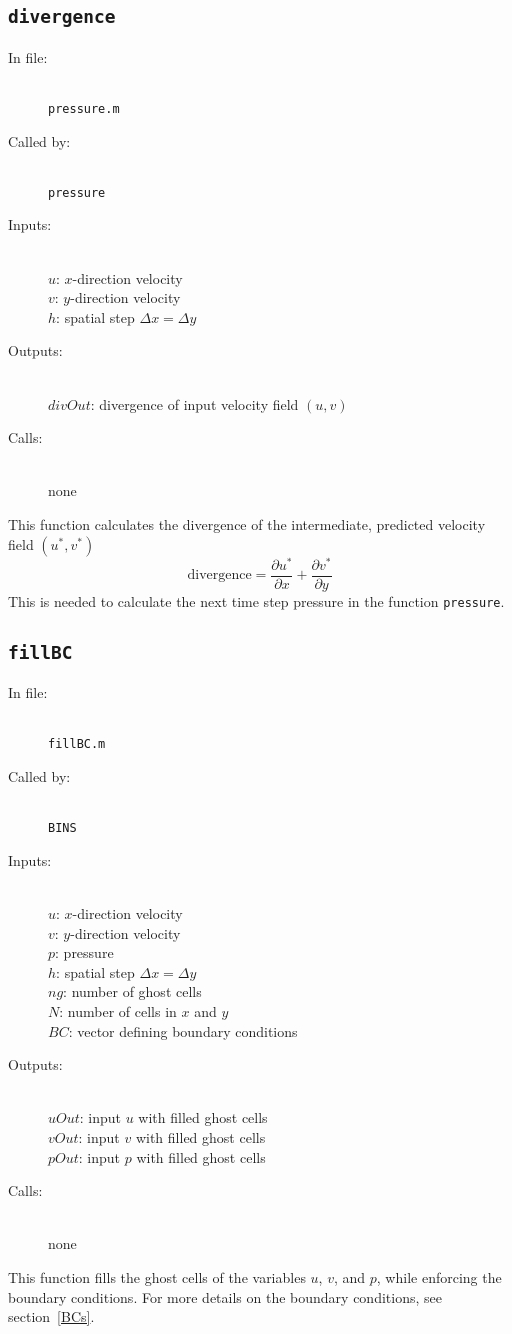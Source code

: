 \documentclass[12pt]{article}
\begin{document}
\subsection{\texttt{divergence}}
\begin{description}
\item[In file:] \hfill \\ \texttt{pressure.m}
\item[Called by:] \hfill \\ \texttt{pressure}
\item[Inputs:] \hfill \\ $u$: $x$-direction velocity \\ $v$: $y$-direction velocity \\ $h$: spatial step $\Delta x = \Delta y$ 
\item[Outputs:] \hfill \\ $divOut$: divergence of input velocity field $(u,v)$
\item[Calls:] \hfill \\ none
\end{description}
This function calculates the divergence of the intermediate, predicted velocity field $(u^*,v^*)$
\[ \text{divergence} = \frac{\partial u^*}{\partial x} + \frac{\partial v^*}{\partial y}\]
This is needed to calculate the next time step pressure in the function \texttt{pressure}.

\subsection{\texttt{fillBC}}
\begin{description}
\item[In file:] \hfill \\ \texttt{fillBC.m}
\item[Called by:] \hfill \\ \texttt{BINS}
\item[Inputs:] \hfill \\ $u$: $x$-direction velocity \\ $v$: $y$-direction velocity \\ $p$: pressure \\ $h$: spatial step $\Delta x = \Delta y$ \\ $ng$: number of ghost cells \\ $N$: number of cells in $x$ and $y$ \\ $BC$: vector defining boundary conditions
\item[Outputs:] \hfill \\ $uOut$: input $u$ with filled ghost cells \\ $vOut$: input $v$ with filled ghost cells \\ $pOut$: input $p$ with filled ghost cells
\item[Calls:] \hfill \\ none
\end{description}
This function fills the ghost cells of the variables $u$, $v$, and $p$, while enforcing the boundary conditions.  For more details on the boundary conditions, see section~\ref{BCs}.
\end{document}
